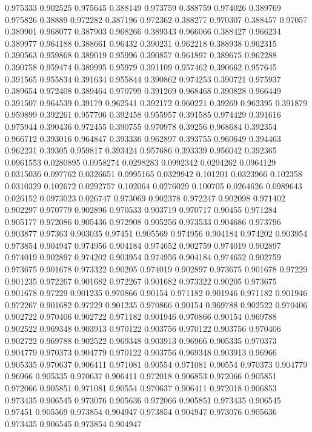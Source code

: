 0.975333 0.902525
0.975645 0.388149
0.973759 0.388759
0.974026 0.389769
0.975826 0.38889
0.972282 0.387196
0.972362 0.388277
0.970307 0.388457
0.97057 0.389901
0.968077 0.387903
0.968266 0.389343
0.966066 0.388427
0.966234 0.389977
0.964188 0.388661
0.96432 0.390231
0.962218 0.388938
0.962315 0.390563
0.959868 0.389019
0.95996 0.390857
0.961897 0.389675
0.962288 0.390758
0.959474 0.389995
0.95979 0.391109
0.957462 0.390662
0.957645 0.391565
0.955834 0.391634
0.955844 0.390862
0.974253 0.390721
0.975937 0.389654
0.972408 0.389464
0.970799 0.391269
0.968468 0.390828
0.966449 0.391507
0.964539 0.39179
0.962541 0.392172
0.960221 0.39269
0.962395 0.391879
0.959899 0.392261
0.957706 0.392458
0.955957 0.391585
0.974429 0.391616
0.975944 0.390436
0.972455 0.390755
0.970978 0.39256
0.968684 0.392354
0.966712 0.393016
0.964847 0.393336
0.962897 0.393755
0.960649 0.394463
0.962231 0.39305
0.959817 0.393424
0.957686 0.393339
0.956042 0.392365
0.0961553 0.0280895
0.0958274 0.0298283
0.0992342 0.0294262
0.0964129 0.0315036
0.097762 0.0326651
0.0995165 0.0329942
0.101201 0.0323966
0.102358 0.0310329
0.102672 0.0292757
0.102064 0.0276029
0.100705 0.0264626
0.0989643 0.026152
0.0973023 0.026747
0.973069 0.902378
0.972247 0.902098
0.971402 0.902297
0.970779 0.902896
0.970533 0.903719
0.970717 0.90455
0.971284 0.905177
0.972086 0.905436
0.972908 0.905256
0.973533 0.904686
0.973796 0.903877
0.97363 0.903035
0.97451 0.905569
0.974956 0.904184
0.974202 0.903954
0.973854 0.904947
0.974956 0.904184
0.974652 0.902759
0.974019 0.902897
0.974019 0.902897
0.974202 0.903954
0.974956 0.904184
0.974652 0.902759
0.973675 0.901678
0.973322 0.90205
0.974019 0.902897
0.973675 0.901678
0.97229 0.901235
0.972267 0.901682
0.972267 0.901682
0.973322 0.90205
0.973675 0.901678
0.97229 0.901235
0.970866 0.90154
0.971182 0.901946
0.971182 0.901946
0.972267 0.901682
0.97229 0.901235
0.970866 0.90154
0.969788 0.902522
0.970406 0.902722
0.970406 0.902722
0.971182 0.901946
0.970866 0.90154
0.969788 0.902522
0.969348 0.903913
0.970122 0.903756
0.970122 0.903756
0.970406 0.902722
0.969788 0.902522
0.969348 0.903913
0.96966 0.905335
0.970373 0.904779
0.970373 0.904779
0.970122 0.903756
0.969348 0.903913
0.96966 0.905335
0.970637 0.906411
0.971081 0.90554
0.971081 0.90554
0.970373 0.904779
0.96966 0.905335
0.970637 0.906411
0.972018 0.906853
0.972066 0.905851
0.972066 0.905851
0.971081 0.90554
0.970637 0.906411
0.972018 0.906853
0.973435 0.906545
0.973076 0.905636
0.972066 0.905851
0.973435 0.906545
0.97451 0.905569
0.973854 0.904947
0.973854 0.904947
0.973076 0.905636
0.973435 0.906545
0.973854 0.904947
